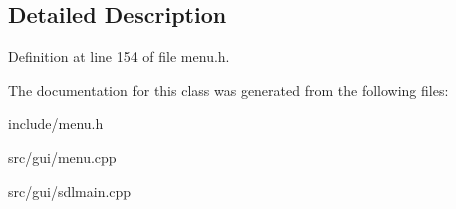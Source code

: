\subsection{Detailed Description}


Definition at line 154 of file menu.\-h.



The documentation for this class was generated from the following files\-:\begin{DoxyCompactItemize}
\item 
include/menu.\-h\item 
src/gui/menu.\-cpp\item 
src/gui/sdlmain.\-cpp\end{DoxyCompactItemize}
